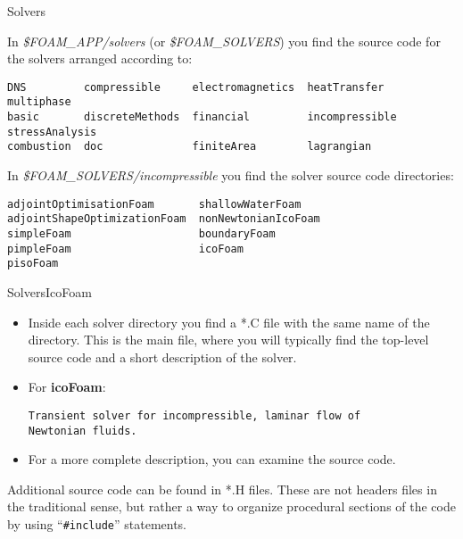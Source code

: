 \documentclass{beamer}
\begin{document}
\begin{frame}[fragile]{Solvers}

In \emph{\$FOAM\_APP/solvers} (or \emph{\$FOAM\_SOLVERS}) you find the source code for the solvers arranged according to:
\begin{tiny}
\begin{verbatim}
DNS         compressible     electromagnetics  heatTransfer    multiphase
basic       discreteMethods  financial         incompressible  stressAnalysis
combustion  doc              finiteArea        lagrangian
\end{verbatim}
\end{tiny}

In \emph{\$FOAM\_SOLVERS/incompressible} you find the solver source code directories:
\begin{small}
\begin{verbatim}
adjointOptimisationFoam       shallowWaterFoam
adjointShapeOptimizationFoam  nonNewtonianIcoFoam         
simpleFoam                    boundaryFoam                  
pimpleFoam                    icoFoam                       
pisoFoam
\end{verbatim}
\end{small}

\end{frame}

\begin{frame}[fragile]{Solvers}{IcoFoam}
\begin{itemize}
\item Inside each solver directory you find a *.C file with the same name of the directory. This is the main file, where you will typically find the top-level source code and a short description of the solver.

\item For \textbf{icoFoam}:\\[0.2cm]

\begin{lrbox}{\mybox}
  \begin{minipage}{29em}
\begin{small}
\begin{verbatim}
Transient solver for incompressible, laminar flow of 
Newtonian fluids.
\end{verbatim}
\end{small}
  \end{minipage}
\end{lrbox}

\fbox{\usebox\mybox}
\vspace{0.1cm}
\item For a more complete description, you can examine the source code.
\end{itemize}

\begin{block}

{\small Additional source code can be found in *.H files. These are not headers files in the traditional sense, but rather a way to organize procedural sections of the code by using ``\texttt{\#include}'' statements.}
\end{block}

\end{frame}
\end{document}
